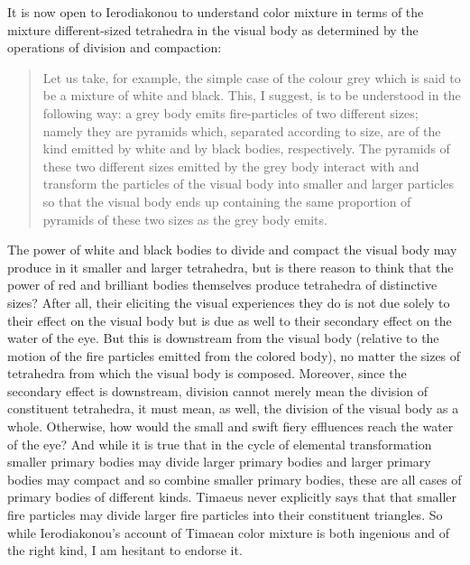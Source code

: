 It is now open to Ierodiakonou to understand color mixture in terms of the mixture different-sized tetrahedra in the visual body as determined by the operations of division and compaction:
\begin{quote}
	Let us take, for example, the simple case of the colour grey which is said to be a mixture of white and black. This, I suggest, is to be understood in the following way: a grey body emits fire-particles of two different sizes; namely they are pyramids which, separated according to size, are of the kind emitted by white and by black bodies, respectively. The pyramids of these two different sizes emitted by the grey body interact with and transform the particles of the visual body into smaller and larger particles so that the visual body ends up containing the same proportion of pyramids of these two sizes as the grey body emits. \citep[228]{Ierodiakonou:2005ly}
\end{quote}

The power of white and black bodies to divide and compact the visual body may produce in it smaller and larger tetrahedra, but is there reason to think that the power of red and brilliant bodies themselves produce tetrahedra of distinctive sizes? After all, their eliciting the visual experiences they do is not due solely to their effect on the visual body but is due as well to their secondary effect on the water of the eye. But this is downstream from the visual body (relative to the motion of the fire particles emitted from the colored body), no matter the sizes of tetrahedra from which the visual body is composed. Moreover, since the secondary effect is downstream, division cannot merely mean the division of constituent tetrahedra, it must mean, as well, the division of the visual body as a whole. Otherwise, how would the small and swift fiery effluences reach the water of the eye? And while it is true that in the cycle of elemental transformation smaller primary bodies may divide larger primary bodies and larger primary bodies may compact and so combine smaller primary bodies, these are all cases of primary bodies of different kinds. Timaeus never explicitly says that that smaller fire particles may divide larger fire particles into their constituent triangles. So while Ierodiakonou's account of Timaean color mixture is both ingenious and of the right kind, I am hesitant to endorse it. 

